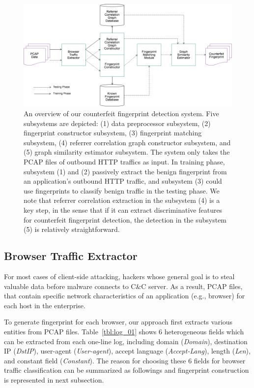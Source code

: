 \begin{figure}[!t]
\centering
\includegraphics[width=400pt]{image/sa.png}
\caption{An overview of our counterfeit fingerprint detection system. Five subsystems are depicted: (1) data preprocessor subsystem, (2) fingerprint constructor subsystem, (3) fingerprint matching subsystem, (4) referrer correlation graph constructor subsystem, and (5) graph similarity estimator subsystem. The system only takes the PCAP files of outbound HTTP traffics as input. In training phase, subsystem (1) and (2) passively extract the benign fingerprint from an application's outbound HTTP traffic, and subsystem (3) could use fingerprints to classify benign traffic in the testing phase. We note that referrer correlation extraction in the subsystem (4) is a key step, in the sense that if it can extract discriminative features for counterfeit fingerprint detection, the detection in the subsystem (5) is relatively straightforward.}
\label{fig:sa}
\end{figure}

\subsection{Browser Traffic Extractor}
\label{sec:bte}

For most cases of client-side attacking, hackers whose general goal is to steal valuable data before malware connects to C\&C server. As a result, PCAP files, that contain specific network characteristics of an application (e.g., browser) for each host in the enterprise. 

To generate fingerprint for each browser, our approach first extracts various entities from PCAP files. Table~\ref{tbl:log_01} shows 6 heterogeneous fields which can be extracted from each one-line log, including domain ({\em Domain}), destination IP ({\em DstIP}), user-agent ({\em User-agent}), accept language ({\em Accept-Lang}), length ({\em Len}), and constant field ({\em Constant}). The reason for choosing these 6 fields for browser traffic classification can be summarized as followings and fingerprint construction is represented in next subsection.

